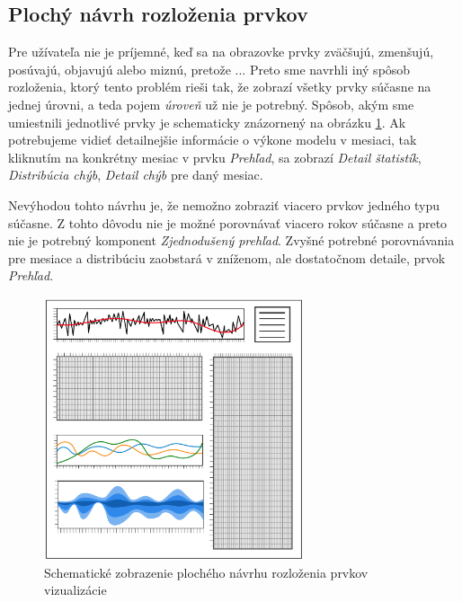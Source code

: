 \subsection{Plochý návrh rozloženia prvkov}
Pre užívateľa nie je príjemné, keď sa na obrazovke prvky zväčšujú, zmenšujú, posúvajú, objavujú alebo miznú, pretože ... %
Preto sme navrhli iný spôsob rozloženia, ktorý tento problém rieši tak, že zobrazí všetky prvky súčasne na jednej úrovni, a teda pojem \textit{úroveň} už nie je potrebný. Spôsob, akým sme umiestnili jednotlivé prvky je schematicky znázornený na obrázku \ref{fig:flatlayout}. Ak potrebujeme vidieť detailnejšie informácie o výkone modelu v mesiaci, tak kliknutím na konkrétny mesiac v prvku \textit{Prehľad}, sa zobrazí \textit{Detail štatistík}, \textit{Distribúcia chýb}, \textit{Detail chýb} pre daný mesiac.

Nevýhodou tohto návrhu je, že nemožno zobraziť viacero prvkov jedného typu súčasne. Z tohto dôvodu nie je možné porovnávať viacero rokov súčasne a preto nie je potrebný komponent \textit{Zjednodušený prehľad}. Zvyšné potrebné porovnávania pre mesiace a distribúciu zaobstará v zníženom, ale dostatočnom detaile, prvok \textit{Prehľad}. 


\begin{figure}
	\centering
	\includegraphics[width = 3.0in]{flatlayout}
	\caption{Schematické zobrazenie plochého návrhu rozloženia prvkov vizualizácie}
	\label{fig:flatlayout}
\end{figure}
